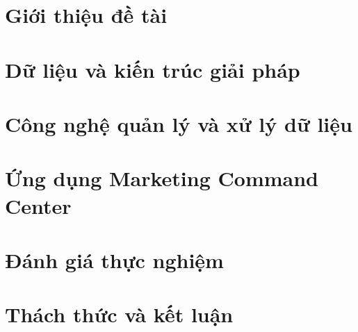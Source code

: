 \documentclass[12pt, a4paper]{report}
\theoremstyle{definition}
\DeclareRobustCommand{\_}{\textunderscore\allowbreak}
\begin{document}
\newpage

\tableofcontents
\listoffigures
\listoftables


\pagestyle{fancy}
\renewcommand{\chaptermark}[1]{\markboth{\MakeUppercase{#1}}{}}
\fancyhf{}
\fancyhead[LE,RO]{\leftmark}
\fancyhead[RE,LO]{}
\fancyfoot[LE,RO]{\thepage}
\renewcommand{\footrulewidth}{0.4pt}




\newpage
\chapter{Giới thiệu đề tài}
\label{chap:gioi-thieu}


\newpage
\chapter{Dữ liệu và kiến trúc giải pháp}
\label{chap:du-lieu-kien-truc}


\newpage
\chapter{Công nghệ quản lý và xử lý dữ liệu}
\label{chap:cong-nghe}


\newpage
\chapter{Ứng dụng Marketing Command Center}
\label{chap:ung-dung}


\newpage
\chapter{Đánh giá thực nghiệm}
\label{chap:danh-gia}


\newpage
\chapter{Thách thức và kết luận}
\label{chap:ket-luan}



\newpage


\end{document}
